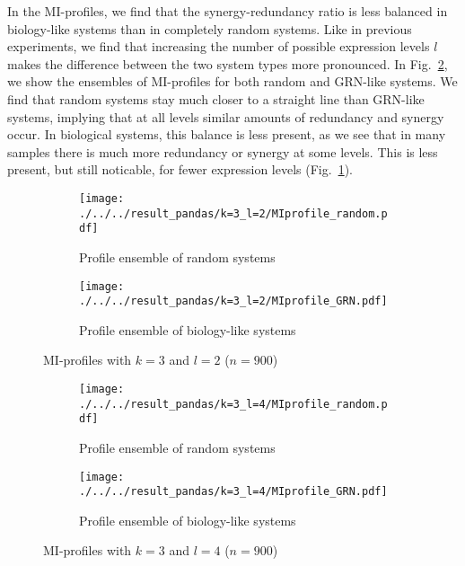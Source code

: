 \documentclass[../main.tex]{subfiles}
\begin{document}
In the MI-profiles, we find that the synergy-redundancy ratio is less balanced in biology-like systems than in completely random systems.
Like in previous experiments, we find that increasing the number of possible expression levels $l$ makes the difference between the two system types more pronounced.
In Fig.~\ref{fig:profilel4}, we show the ensembles of MI-profiles for both random and GRN-like systems.
We find that random systems stay much closer to a straight line than GRN-like systems, implying that at all levels similar amounts of redundancy and synergy occur.
In biological systems, this balance is less present, as we see that in many samples there is much more redundancy or synergy at some levels.
This is less present, but still noticable, for fewer expression levels (Fig.~\ref{fig:profilel2}).

\begin{figure}[H]
    \centering
    \begin{subfigure}[b]{0.4\textwidth}
        \texttt{[image: ./../../result\_pandas/k=3\_l=2/MIprofile\_random.pdf]}
        \caption{Profile ensemble of random systems}
    \end{subfigure}
    \begin{subfigure}[b]{0.4\textwidth}
        \texttt{[image: ./../../result\_pandas/k=3\_l=2/MIprofile\_GRN.pdf]}
        \caption{Profile ensemble of biology-like systems}
    \end{subfigure}
    \caption{MI-profiles with $k=3$ and $l=2$ ($n=900$)}
    \label{fig:profilel2}
\end{figure}

\begin{figure}[H]
    \centering
    \begin{subfigure}[b]{0.4\textwidth}
        \texttt{[image: ./../../result\_pandas/k=3\_l=4/MIprofile\_random.pdf]}
        \caption{Profile ensemble of random systems}
    \end{subfigure}
    \begin{subfigure}[b]{0.4\textwidth}
        \texttt{[image: ./../../result\_pandas/k=3\_l=4/MIprofile\_GRN.pdf]}
        \caption{Profile ensemble of biology-like systems}
    \end{subfigure}
    \caption{MI-profiles with $k=3$ and $l=4$ ($n=900$)}
    \label{fig:profilel4}
\end{figure}


\end{document}
